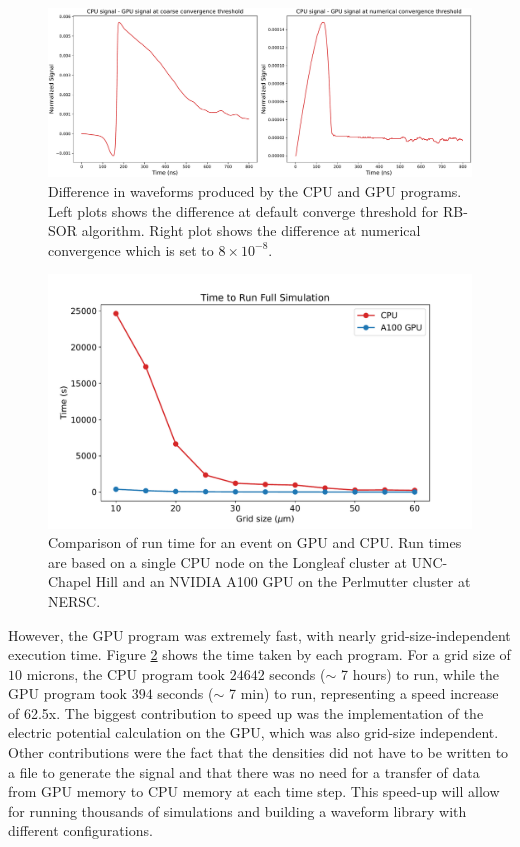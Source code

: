 \begin{figure}[!ht]
\centering
 \includegraphics[width=0.99\linewidth]{ch4/figs/converge_threshold_dif.pdf}
\caption{Difference in waveforms produced by the CPU and GPU programs. Left plots shows the difference at default converge threshold for RB-SOR algorithm. Right plot shows the difference at numerical convergence which is set to $8\times10^{-8}$.}
\label{ch4_fig_cov_thres_diff} 
\end{figure}

\begin{figure}[!htb]
\centering
 \includegraphics[width=0.99\linewidth]{ch4/figs/cpu_gpu_comp.pdf}
\caption{ Comparison of run time for an {\ehd} event on GPU and CPU. Run times are based on a single CPU node on the Longleaf cluster at UNC-Chapel Hill and an NVIDIA A100 GPU on the Perlmutter cluster at NERSC.}
\label{fig:GPU_time}
\end{figure}


However, the GPU program was extremely fast, with nearly grid-size-independent execution time. Figure \ref{fig:GPU_time} shows the time taken by each program. For a grid size of $10$ microns, the CPU program took $24642$ seconds ($\sim$ 7 hours) to run, while the GPU program took $394$ seconds ($\sim$ 7 min) to run, representing a speed increase of 62.5x. The biggest contribution to speed up was the implementation of the electric potential calculation on the GPU, which was also grid-size independent. Other contributions were the fact that the densities did not have to be written to a file to generate the signal and that there was no need for a transfer of data from GPU memory to CPU memory at each time step. This speed-up will allow for running thousands of simulations and building a waveform library with different configurations.

